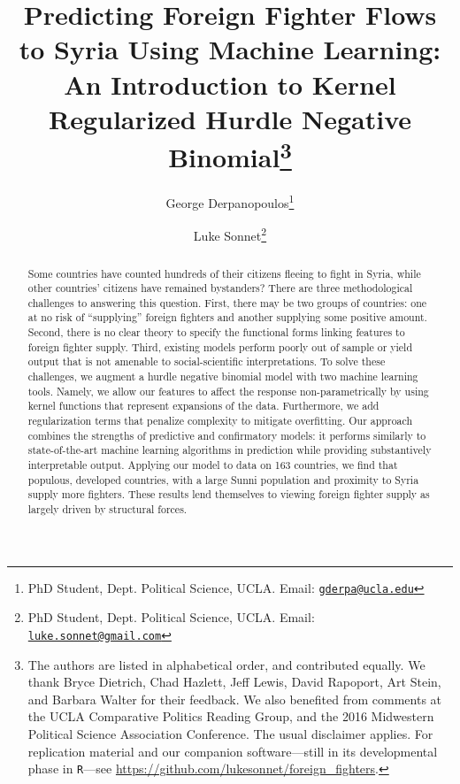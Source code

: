 \documentclass[12pt]{article}
\begin{document}
\title{Predicting Foreign Fighter Flows to Syria Using Machine Learning: An Introduction to Kernel Regularized Hurdle Negative Binomial\thanks{The authors are listed in alphabetical order, and contributed equally. We thank Bryce Dietrich, Chad Hazlett, Jeff Lewis, David Rapoport, Art Stein, and Barbara Walter for their feedback. We also benefited from comments at the UCLA Comparative Politics Reading Group, and the 2016 Midwestern Political Science Association Conference. The usual disclaimer applies. For replication material and our companion software---still in its developmental phase in \texttt{R}---see \href{https://github.com/lukesonnet/foreign_fighters}{https://github.com/lukesonnet/foreign\_fighters}.}}

\author{George Derpanopoulos\thanks{PhD Student, Dept. Political Science, UCLA. Email: \href{mailto:gderpa@ucla.edu}{\tt gderpa@ucla.edu}} \and Luke Sonnet\thanks{PhD Student, Dept. Political Science, UCLA. Email: \href{mailto:luke.sonnet@gmail.com}{\tt luke.sonnet@gmail.com}}}

	\maketitle
	\thispagestyle{empty} 
	\singlespacing

\begin{abstract}	
Some countries have counted hundreds of their citizens fleeing to fight in Syria, while other countries' citizens have remained bystanders? There are three methodological challenges to answering this question. First, there may be two groups of countries: one at no risk of ``supplying'' foreign fighters and another supplying some positive amount. Second, there is no clear theory to specify the functional forms linking features to foreign fighter supply. Third, existing models perform poorly out of sample or yield output that is not amenable to social-scientific interpretations. To solve these challenges, we augment a hurdle negative binomial model with two machine learning tools. Namely, we allow our features to affect the response non-parametrically by using kernel functions that represent expansions of the data. Furthermore, we add regularization terms that penalize complexity to mitigate overfitting. Our approach combines the strengths of predictive and confirmatory models: it performs similarly to state-of-the-art machine learning algorithms in prediction while providing substantively interpretable output.  Applying our model to data on 163 countries, we find that populous, developed countries, with a large Sunni population and proximity to Syria supply more fighters. These results lend themselves to viewing foreign fighter supply as largely driven by structural forces.
\end{abstract}
\end{document}
